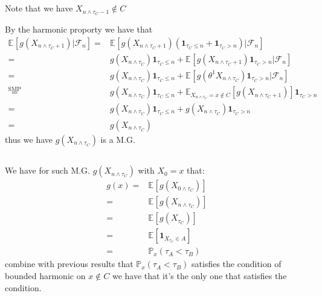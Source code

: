 \documentclass[11pt,a4paper]{ctexart}
\numberwithin{equation}{section}%
\newcommand{\F}{\mathcal{F}}
\begin{document}
\subsection{}

Note that we have $ X_{n\wedge \tau_C - 1}\not\in C$

By the harmonic proporty we have that 
\begin{align*}
    \mathbb{E}_{  }\left[  g(X_{n\wedge \tau_C + 1 })| \F_n \right] =& \mathbb{E}_{  }\left[  g(X_{n\wedge \tau_C + 1 }) ( \mathbf{1}_{ \tau_C \leq n  } + \mathbf{1}_{\tau _C > n})  | \F_n \right] \\
    =& g(X_{n\wedge \tau_C}) \mathbf{1}_{\tau_C\leq n} + \mathbb{E}_{  }\left[  g(X_{n\wedge \tau_C + 1 }) \mathbf{1}_{\tau_C > n} | \F_n \right] \\
    =&g( X_{n\wedge \tau_C}) \mathbf{1}_{\tau_C\leq n} + \mathbb{E}_{  }\left[ g(\theta ^1 X_{  n\wedge \tau_C  }) \mathbf{1}_{\tau_C > n} | \F_n \right] \\
    \mathop{ = }\limits^{\text{SMP}}& g( X_{n\wedge \tau_C}) \mathbf{1}_{\tau_C\leq n} + \mathbb{E}_{ X_{n\wedge \tau_C} =x\not\in C }\left[ g( X_{  n\wedge \tau_C +1 })  \right]\mathbf{1}_{\tau_C > n} \\
    =& g( X_{n\wedge \tau_C}) \mathbf{1}_{\tau_C\leq n} + g( X_{n\wedge \tau_C}) \mathbf{1}_{\tau_C > n} \\
    =& g( X_{n\wedge \tau_C})
\end{align*}
thus we have $ g(X_{n\wedge \tau_C}) $ is a M.G.

\subsection{}

We have for such M.G. $ g(X_{n\wedge \tau_C}) $ with $ X_0 = x $ that:
\begin{align*}
    g(x)=&\mathbb{E}_{  }\left[ g(X_{0\wedge \tau_C}) \right]\\
    =& \mathbb{E}_{  }\left[ g(X_{n \wedge \tau_C}) \right]\\
    =& \mathbb{E}_{  }\left[ g(X_{\tau_C}) \right] \\
    =& \mathbb{E}_{  }\left[ \mathbf{1}_{X_{\tau_C} \in A} \right]\\
    =& \mathbb{P}_{ x }\left( \tau_A < \tau_B \right) 
\end{align*}
combine with previous results that $ \mathbb{P}_{ x }\left( \tau_A<\tau_B \right)  $ satisfies the condition of bounded harmonic on $ x\not\in C $ we have that it's the only one that satisfies the condition.
\end{document}
